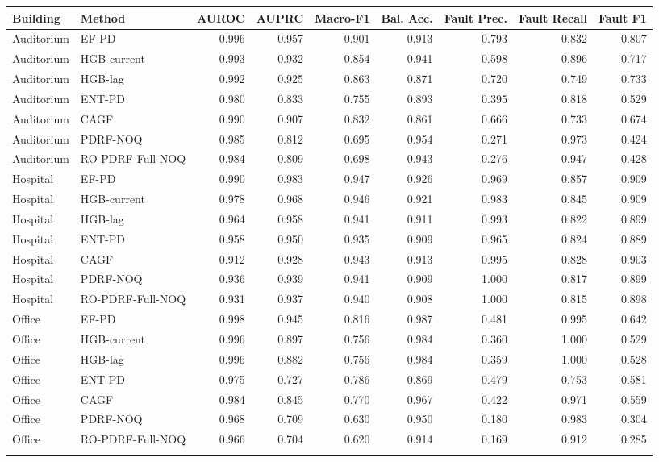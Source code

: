 \begin{tabular}{llrrrrrrr}
\toprule
Building & Method & AUROC & AUPRC & Macro-F1 & Bal. Acc. & Fault Prec. & Fault Recall & Fault F1 \\
\midrule
Auditorium & EF-PD & 0.996 & 0.957 & 0.901 & 0.913 & 0.793 & 0.832 & 0.807 \\
Auditorium & HGB-current & 0.993 & 0.932 & 0.854 & 0.941 & 0.598 & 0.896 & 0.717 \\
Auditorium & HGB-lag & 0.992 & 0.925 & 0.863 & 0.871 & 0.720 & 0.749 & 0.733 \\
Auditorium & ENT-PD & 0.980 & 0.833 & 0.755 & 0.893 & 0.395 & 0.818 & 0.529 \\
Auditorium & CAGF & 0.990 & 0.907 & 0.832 & 0.861 & 0.666 & 0.733 & 0.674 \\
Auditorium & PDRF-NOQ & 0.985 & 0.812 & 0.695 & 0.954 & 0.271 & 0.973 & 0.424 \\
Auditorium & RO-PDRF-Full-NOQ & 0.984 & 0.809 & 0.698 & 0.943 & 0.276 & 0.947 & 0.428 \\
\addlinespace
Hospital & EF-PD & 0.990 & 0.983 & 0.947 & 0.926 & 0.969 & 0.857 & 0.909 \\
Hospital & HGB-current & 0.978 & 0.968 & 0.946 & 0.921 & 0.983 & 0.845 & 0.909 \\
Hospital & HGB-lag & 0.964 & 0.958 & 0.941 & 0.911 & 0.993 & 0.822 & 0.899 \\
Hospital & ENT-PD & 0.958 & 0.950 & 0.935 & 0.909 & 0.965 & 0.824 & 0.889 \\
Hospital & CAGF & 0.912 & 0.928 & 0.943 & 0.913 & 0.995 & 0.828 & 0.903 \\
Hospital & PDRF-NOQ & 0.936 & 0.939 & 0.941 & 0.909 & 1.000 & 0.817 & 0.899 \\
Hospital & RO-PDRF-Full-NOQ & 0.931 & 0.937 & 0.940 & 0.908 & 1.000 & 0.815 & 0.898 \\
\addlinespace
Office & EF-PD & 0.998 & 0.945 & 0.816 & 0.987 & 0.481 & 0.995 & 0.642 \\
Office & HGB-current & 0.996 & 0.897 & 0.756 & 0.984 & 0.360 & 1.000 & 0.529 \\
Office & HGB-lag & 0.996 & 0.882 & 0.756 & 0.984 & 0.359 & 1.000 & 0.528 \\
Office & ENT-PD & 0.975 & 0.727 & 0.786 & 0.869 & 0.479 & 0.753 & 0.581 \\
Office & CAGF & 0.984 & 0.845 & 0.770 & 0.967 & 0.422 & 0.971 & 0.559 \\
Office & PDRF-NOQ & 0.968 & 0.709 & 0.630 & 0.950 & 0.180 & 0.983 & 0.304 \\
Office & RO-PDRF-Full-NOQ & 0.966 & 0.704 & 0.620 & 0.914 & 0.169 & 0.912 & 0.285 \\
\addlinespace
\bottomrule
\end{tabular}
